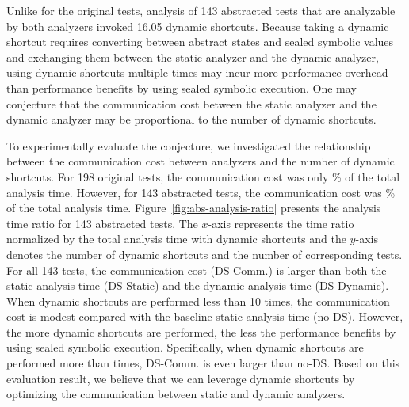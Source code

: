 Unlike for the original tests, analysis of 143
abstracted tests that are analyzable by both analyzers invoked
16.05 dynamic shortcuts.  Because taking a dynamic shortcut
requires converting between abstract states and sealed symbolic values
and exchanging them between the static analyzer and the dynamic analyzer,
using dynamic shortcuts multiple times may incur more performance
overhead than performance benefits by using sealed symbolic execution.
One may conjecture that the communication cost between the static
analyzer and the dynamic analyzer may be proportional to the number of
dynamic shortcuts.

\todo
To experimentally evaluate the conjecture, we investigated the relationship between
the communication cost between analyzers and the number of dynamic shortcuts.
For 198 original tests, the communication cost was only
\% of the total analysis time.  However, for 143
abstracted tests, the communication cost was \% of the
total analysis time.  Figure~\ref{fig:abs-analysis-ratio} presents the
analysis time ratio for 143 abstracted tests.
The $x$-axis represents the time ratio normalized by the total analysis time with dynamic shortcuts
and the $y$-axis denotes the number of dynamic shortcuts and the number of corresponding tests.
For all 143 tests, the communication cost (DS-Comm.) is larger than
both the static analysis time (DS-Static) and the dynamic analysis
time (DS-Dynamic).  When dynamic shortcuts are performed less than 10 times,
the communication cost is modest compared with the baseline static
analysis time (no-DS).  However, the more dynamic shortcuts are performed,
the less the performance benefits by using sealed symbolic execution.
Specifically, when dynamic shortcuts are performed more than
 times, DS-Comm. is even larger than no-DS.
Based on this evaluation result, we believe that we can leverage
dynamic shortcuts by optimizing the communication between static and dynamic analyzers.


